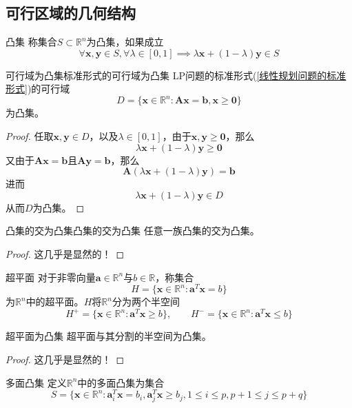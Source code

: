 \documentclass[lang = cn, scheme = chinese, thmcnt = section]{elegantbook}
\newcommand{\R}{\mathbb{R}}            %
\newcommand{\sub}{\subset}             %
\newcommand{\bs}{\boldsymbol}          %
\begin{document}
\subsection{可行区域的几何结构}

\begin{definition}{凸集}
	称集合$S\sub \R^n$为凸集，如果成立
	$$
	\forall \bs{x},\bs{y}\in S,\forall \lambda\in[0,1]\implies
	\lambda\bs{x}+(1-\lambda)\bs{y}\in S
	$$
\end{definition}

\begin{theorem}{可行域为凸集}{标准形式的可行域为凸集}
	LP问题的标准形式(\ref{线性规划问题的标准形式})的可行域
	$$
	D=\{ \bs{x}\in\R^n:\bs{A}\bs{x}=\bs{b},\bs{x}\ge \bs{0} \}
	$$
	为凸集。
\end{theorem}

\begin{proof}
	任取$\bs{x},\bs{y}\in D$，以及$\lambda\in [0,1]$，由于$\bs{x},\bs{y}\ge \bs{0}$，那么
	$$
	\lambda\bs{x}+(1-\lambda)\bs{y}\ge \bs{0}
	$$
	又由于$\bs{A}\bs{x}=\bs{b}$且$\bs{A}\bs{y}=\bs{b}$，那么
	$$
	\bs{A}(\lambda\bs{x}+(1-\lambda)\bs{y})=\bs{b}
	$$
	进而
	$$
	\lambda\bs{x}+(1-\lambda)\bs{y}\in D
	$$
	从而$D$为凸集。
\end{proof}

\begin{lemma}{凸集的交为凸集}{凸集的交为凸集}
	任意一族凸集的交为凸集。
\end{lemma}

\begin{proof}
	这几乎是显然的！
\end{proof}

\begin{definition}{超平面}
	对于非零向量$\bs{a}\in\R^n$与$b\in\R$，称集合
	$$
	H=\{ \bs{x}\in\R^n:\bs{a}^T\bs{x}=b \}
	$$
	为$\R^n$中的超平面。$H$将$\R^n$分为两个半空间
	$$
	H^+=\{ \bs{x}\in\R^n:\bs{a}^T\bs{x}\ge b \},\qquad 
	H^-=\{ \bs{x}\in\R^n:\bs{a}^T\bs{x}\le b \}
	$$
\end{definition}

\begin{lemma}{}{超平面为凸集}
	超平面与其分割的半空间为凸集。
\end{lemma}

\begin{proof}
	这几乎是显然的！
\end{proof}

\begin{definition}{多面凸集}
	定义$\R^n$中的多面凸集为集合
	$$
	S=\{ \bs{x}\in\R^n:\bs{a}_i^T\bs{x}=b_i,\bs{a}_j^T\bs{x}\ge b_j,1\le i \le p,p+1\le j \le p+q \}
	$$
\end{definition}
\end{document}
